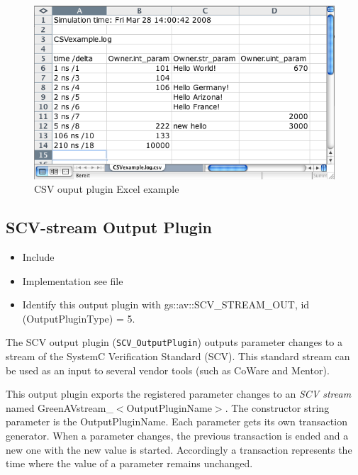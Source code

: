 \begin{figure}[htbp]
	\centerline{
		\includegraphics[width=15cm]{./images/csvExcelExample}}
	\caption{CSV ouput plugin Excel example}
	\label{fig:GAVcsvExcelExample}
\end{figure}


\subsection{SCV-stream Output Plugin}
\label{GAVOPscv}

\begin{itemize}
  \item Include 
  \item Implementation see file 
  \item Identify this output plugin with {\sffamily gs::av::SCV\_STREAM\_OUT}, \newline
           id ({\sffamily OutputPluginType}) = 5.
\end{itemize}

The SCV output plugin (\lstinline|SCV_OutputPlugin|) outputs parameter changes to a stream of the SystemC Verification Standard (SCV). This standard stream can be used as an input to several vendor tools (such as CoWare and Mentor).

 This output plugin exports the registered
 parameter changes to an {\em SCV stream} named \mbox{\sffamily GreenAVstream\_$<$OutputPluginName$>$}. The constructor string parameter is the {\sffamily OutputPluginName}. Each
 parameter gets its own transaction generator. When a parameter changes, the previous
 transaction is ended and a new one with the new value is started. Accordingly a 
 transaction represents the time where the value of a parameter remains unchanged.

